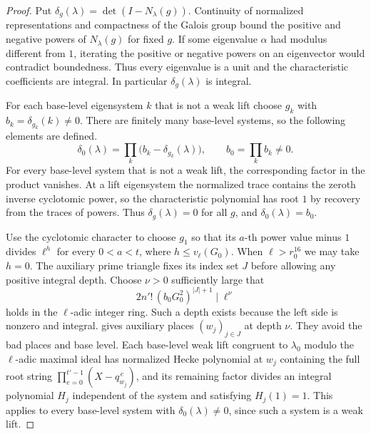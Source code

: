\begin{proof}
Put $\delta_g(\lambda)=\det(I-N_\lambda(g))$. Continuity of normalized representations and compactness of the Galois group bound the positive and negative powers of $N_\lambda(g)$ for fixed $g$. If some eigenvalue $\alpha$ had modulus different from $1$, iterating the positive or negative powers on an eigenvector would contradict boundedness. Thus every eigenvalue is a unit and the characteristic coefficients are integral. In particular $\delta_g(\lambda)$ is integral.

For each base-level eigensystem $k$ that is not a weak lift choose $g_k$ with $b_k=\delta_{g_k}(k)\ne0$. There are finitely many base-level systems, so the following elements are defined.
\[
 \delta_0(\lambda)=\prod_k \bigl(b_k-\delta_{g_k}(\lambda)\bigr),
 \qquad b_0=\prod_k b_k\ne0 .
\]
For every base-level system that is not a weak lift, the corresponding factor in the product vanishes. At a lift eigensystem the normalized trace contains the zeroth inverse cyclotomic power, so the characteristic polynomial has root $1$ by recovery from the traces of powers. Thus $\delta_g(\lambda)=0$ for all $g$, and $\delta_0(\lambda)=b_0$.

Use the cyclotomic character to choose $g_1$ so that its $a$-th power value minus $1$ divides $\ell^h$ for every $0<a<t$, where $h\le v_\ell(G_0)$. When $\ell>r_0^{16}$ we may take $h=0$. The auxiliary prime triangle fixes its index set $J$ before allowing any positive integral depth. Choose $\nu>0$ sufficiently large that
\[
 2n'!\,(b_0G_0^2)^{|J|+1}\mid \ell^\nu
\]
holds in the $\ell$-adic integer ring. Such a depth exists because the left side is nonzero and integral.  gives auxiliary places $(w_j)_{j\in J}$ at depth $\nu$. They avoid the bad places and base level. Each base-level weak lift congruent to $\lambda_0$ modulo the $\ell$-adic maximal ideal has normalized Hecke polynomial at $w_j$ containing the full root string $\prod_{e=0}^{t'-1}(X-q_{w_j}^{\,e})$, and its remaining factor divides an integral polynomial $H_j$ independent of the system and satisfying $H_j(1)=1$. This applies to every base-level system with $\delta_0(\lambda)\ne0$, since such a system is a weak lift.


\end{proof}

